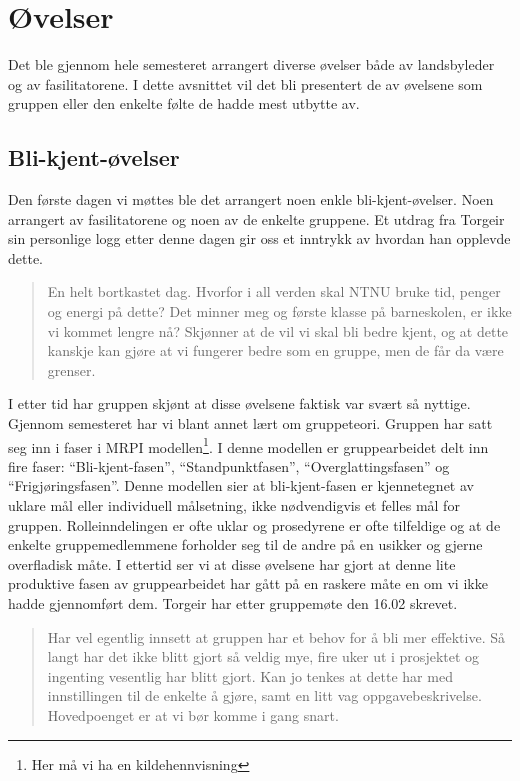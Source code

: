 \section{Øvelser}
Det ble gjennom hele semesteret arrangert diverse øvelser både av landsbyleder og av fasilitatorene. 
I dette avsnittet vil det bli presentert de av øvelsene som gruppen eller den enkelte følte de hadde mest utbytte av.

\subsection{Bli-kjent-øvelser}
Den første dagen vi møttes ble det arrangert noen enkle bli-kjent-øvelser. 
Noen arrangert av fasilitatorene og noen av de enkelte gruppene. 
Et utdrag fra Torgeir sin personlige logg etter denne dagen gir oss et inntrykk av hvordan han opplevde dette.

\begin{quote}
En helt bortkastet dag. Hvorfor i all verden skal NTNU bruke tid, penger og energi på dette? 
Det minner meg og første klasse på barneskolen, er ikke vi kommet lengre nå? 
Skjønner at de vil vi skal bli bedre kjent, og at dette kanskje kan gjøre at vi fungerer bedre som en gruppe, men de får da være grenser. 
\end{quote}

I etter tid har gruppen skjønt at disse øvelsene faktisk var svært så nyttige. 
Gjennom semesteret har vi blant annet lært om gruppeteori. 
Gruppen har satt seg inn i faser i MRPI modellen\footnote{Her må vi ha en kildehennvisning}.
I denne modellen er gruppearbeidet delt inn fire faser: 
“Bli-kjent-fasen”, “Standpunktfasen”, “Overglattingsfasen” og “Frigjøringsfasen”. 
Denne modellen sier at bli-kjent-fasen er kjennetegnet av uklare mål eller individuell målsetning, 
ikke nødvendigvis et felles mål for gruppen. 
Rolleinndelingen er ofte uklar og prosedyrene er ofte tilfeldige og at de enkelte gruppemedlemmene forholder seg til de andre på en usikker og gjerne overfladisk måte.
I ettertid ser vi at disse øvelsene har gjort at denne lite produktive fasen av gruppearbeidet har gått på en raskere måte en om vi ikke hadde gjennomført dem. 
Torgeir har etter gruppemøte den 16.02 skrevet.

\begin{quote}
Har vel egentlig innsett at gruppen har et behov for å bli mer effektive. 
Så langt har det ikke blitt gjort så veldig mye, fire uker ut i prosjektet og ingenting vesentlig har blitt gjort. 
Kan jo tenkes at dette har med innstillingen til de enkelte å gjøre, samt en litt vag oppgavebeskrivelse. 
Hovedpoenget er at vi bør komme i gang snart. 
\end{quote}

